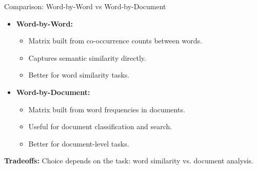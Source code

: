\begin{frame}{Comparison: Word-by-Word vs Word-by-Document}
    \begin{itemize}
        \item \textbf{Word-by-Word:}
        \begin{itemize}
            \item Matrix built from co-occurrence counts between words.
            \item Captures semantic similarity directly.
            \item Better for word similarity tasks.
        \end{itemize}
        \item \textbf{Word-by-Document:}
        \begin{itemize}
            \item Matrix built from word frequencies in documents.
            \item Useful for document classification and search.
            \item Better for document-level tasks.
        \end{itemize}
    \end{itemize}
    \vspace{1em}
    \textbf{Tradeoffs:} Choice depends on the task: word similarity vs. document analysis.
\end{frame}